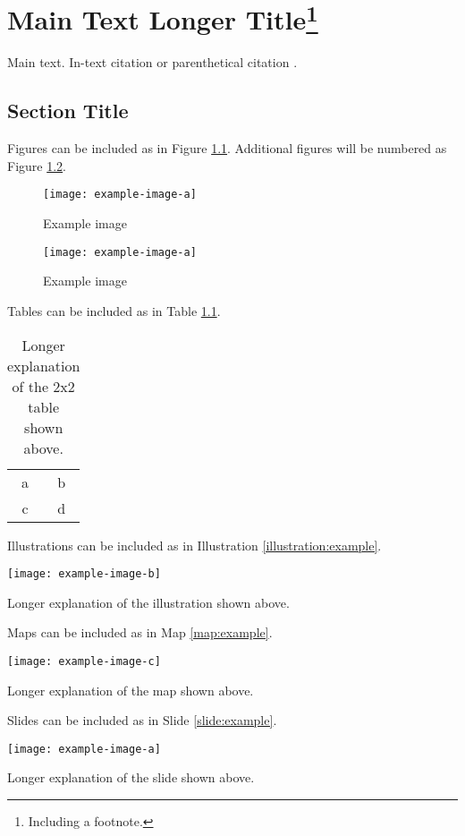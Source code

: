 \chapter[Main Text Short Title]{Main Text Longer Title\footnote{Including a footnote.}}
\label{main}
Main text. In-text citation \citet{knuth:tb} or parenthetical citation \citep{knuth:tb}.

\section{Section Title}
Figures can be included as in Figure \ref{fig:example}. Additional figures will be numbered as Figure \ref{fig:example2}.
\begin{figure}[h]
    \centering
    \texttt{[image: example-image-a]}
    \caption{Example image}
    \label{fig:example}
\end{figure}
\begin{figure}[ht]
    \centering
    \texttt{[image: example-image-a]}
    \caption{Example image}
    \label{fig:example2}
\end{figure}

Tables can be included as in Table \ref{tab:example}.
\begin{table}[t]
    \centering
    \begin{tabular}{c|c}
         a & b \\
         c & d
    \end{tabular}
    \caption[Short example table title]{Longer explanation of the 2x2 table shown above.}
    \label{tab:example}
\end{table}

Illustrations can be included as in Illustration \ref{illustration:example}.
\begin{illustration}[H]
    \centering
    \texttt{[image: example-image-b]}
    \caption[Short example illustration title]{Longer explanation of the illustration shown above.}
    \label{illustration:example}
\end{illustration}

Maps can be included as in Map \ref{map:example}.
\begin{map}[H]
    \centering
    \texttt{[image: example-image-c]}
    \caption[Short example map title]{Longer explanation of the map shown above.}
    \label{map:example}
\end{map}

Slides can be included as in Slide \ref{slide:example}.
\begin{slide}[H]
    \centering
    \texttt{[image: example-image-a]}
    \caption[Short example slide title]{Longer explanation of the slide shown above.}
    \label{slide:example}
\end{slide}

